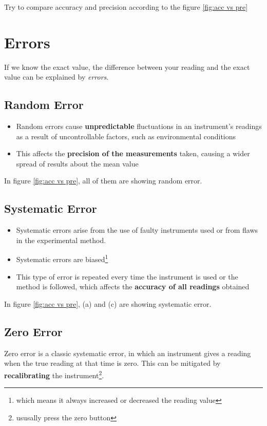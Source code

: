 \documentclass[a4paper]{tufte-handout}
\newenvironment{SummBox}
{\begin{tcolorbox}[breakable,colback=r1!30,colframe=r1,title=Summary]} {\end{tcolorbox}}
\begin{document}
\begin{SummBox}
Try to compare accuracy and precision according to the figure \ref{fig:acc vs pre}
\vspace{0.5in}
\end{SummBox}


\section{Errors}
If we know the exact value, the difference between your reading and the exact value can be explained by \emph{errors}.
\subsection{Random Error}
\begin{itemize}
	\item Random errors cause \textbf{unpredictable} fluctuations in an instrument’s readings as a result of uncontrollable factors, such as environmental conditions
	\item This affects the \textbf{precision of the measurements} taken, causing a wider spread of results about the mean value
\end{itemize}
In figure \ref{fig:acc vs pre}, all of them are showing random error.


\subsection{Systematic Error}
\begin{itemize}
	\item Systematic errors arise from the use of faulty instruments used or from flaws in the experimental method.
	\item Systematic errors are biased\footnote{which means it always increased or decreased the reading value}
	\item This type of error is repeated every time the instrument is used or the method is followed, which affects the \textbf{accuracy of all readings} obtained
\end{itemize}
In figure \ref{fig:acc vs pre}, (a) and (c) are showing systematic error.

\subsection{Zero Error}
Zero error is a classic systematic error, in which an instrument gives a reading when the true reading at that time is zero. This can be mitigated by \textbf{recalibrating} the instrument\footnote{ususally press the zero button}.
\end{document}
